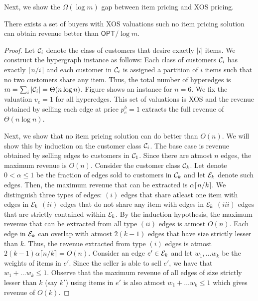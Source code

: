 Next, we show the $\Omega(\log m)$ gap between item pricing and XOS pricing.

\begin{lemma}
	There exists a set of buyers with XOS valuations such no item pricing solution can obtain revenue better than $\textsf{OPT}/ \log m$.
\end{lemma}
\begin{proof}
	Let $\mathcal{C}_i$ denote the class of customers that desire exactly $\vert i \vert$ items. We construct the hypergraph instance as follows: Each class of customers $\mathcal{C}_i$ has exactly $\lceil n/i \rceil$ and each customer in $\mathcal{C}_i$ is assigned a partition of $i$ items such that no two customers share any item. Thus, the total number of hyperedges is $m = \sum_{i} \vert \mathcal{C}_i \vert = \Theta( n \log n)$. Figure shows  an instance for $n=6$. We fix the valuation $v_e = 1$ for all hyperedges. This set of valuations is XOS and the revenue obtained by selling each edge at price $p^{b}_e = 1$ extracts the full revenue of $\Theta(n \log n)$.
	
	Next, we show that no item pricing solution can do better than $O(n)$. We will show this by induction on the customer class $\mathcal{C}_i$. The base case is revenue obtained by selling edges to customers in $\mathcal{C}_1$. Since there are atmost $n$ edges, the maximum revenue is $O(n)$. Consider the customer class $\mathcal{C}_k$. Let denote $0 < \alpha \leq 1$ be the fraction of edges sold to customers in $\mathcal{C}_k$ and let $\mathcal{E}_k$ denote such edges. Then, the maximum revenue that can be extracted is $\alpha \lceil n/k \rceil$. We distinguish three types of edges: $(i)$ edges that share atleast one item with edges in $\mathcal{E}_k$ $(ii)$ edges that do not share any item with edges in $\mathcal{E}_k$ $(iii)$ edges that are strictly contained within $\mathcal{E}_k$. By the induction hypothesis, the maximum revenue that can be extracted from all type $(ii)$ edges is atmost $O(n)$. Each edge in $\mathcal{E}_k$ can overlap with atmost $2(k-1)$ edges that have size strictly lesser than $k$. Thus, the revenue extracted from type $(i)$ edges is atmost $2(k-1) \alpha \lceil n/k \rceil = O(n)$. Consider an edge $e' \in \mathcal{E}_k$ and let $w_1, \dots w_k$ be the weights of items in $e'$. Since the seller is able to sell $e'$, we have that $w_1 + \dots w_k \leq 1$. Observe that the maximum revenue of all edges of size strictly lesser than $k$ (say $k'$) using items in $e'$ is also atmost $w_1 + \dots w_k \leq 1$ which gives revenue of $O(k)$. 
\end{proof}

